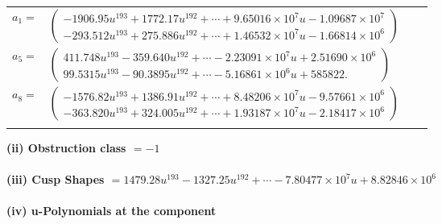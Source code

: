 \documentclass[1p]{elsarticle_modified}
\theoremstyle{definition}
\begin{document}
\begin{tabular}{m{7pt} m{180pt} m{7pt} m{180pt} }
\flushright $a_{1}=$&$\begin{pmatrix}-1906.95 u^{193}+1772.17 u^{192}+\cdots+9.65016\times10^{7} u-1.09687\times10^{7}\\-293.512 u^{193}+275.886 u^{192}+\cdots+1.46532\times10^{7} u-1.66814\times10^{6}\end{pmatrix}$ \\
\flushright $a_{5}=$&$\begin{pmatrix}411.748 u^{193}-359.640 u^{192}+\cdots-2.23091\times10^{7} u+2.51690\times10^{6}\\99.5315 u^{193}-90.3895 u^{192}+\cdots-5.16861\times10^{6} u+585822.\end{pmatrix}$ \\
\flushright $a_{8}=$&$\begin{pmatrix}-1576.82 u^{193}+1386.91 u^{192}+\cdots+8.48206\times10^{7} u-9.57661\times10^{6}\\-363.820 u^{193}+324.005 u^{192}+\cdots+1.93187\times10^{7} u-2.18417\times10^{6}\end{pmatrix}$\\&\end{tabular}
\flushleft \textbf{(ii) Obstruction class $= -1$}\\~\\
\flushleft \textbf{(iii) Cusp Shapes $= 1479.28 u^{193}-1327.25 u^{192}+\cdots-7.80477\times10^{7} u+8.82846\times10^{6}$}\\~\\
\newpage\renewcommand{\arraystretch}{1}
\flushleft \textbf{(iv) u-Polynomials at the component}\newline \\
\end{document}
